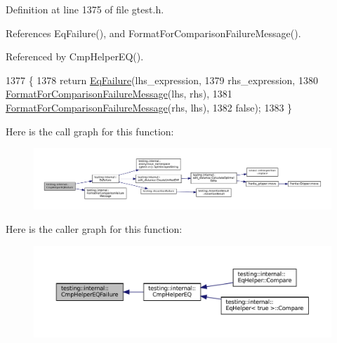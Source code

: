 Definition at line 1375 of file gtest.\+h.



References Eq\+Failure(), and Format\+For\+Comparison\+Failure\+Message().



Referenced by Cmp\+Helper\+E\+Q().


\begin{DoxyCode}
1377                                                                  \{
1378   \textcolor{keywordflow}{return} \hyperlink{namespacetesting_1_1internal_a08725846ff184d3e79bcf5be4df19157}{EqFailure}(lhs\_expression,
1379                    rhs\_expression,
1380                    \hyperlink{namespacetesting_1_1internal_a91ab078f10adc669f09b7f604975c518}{FormatForComparisonFailureMessage}(lhs, rhs),
1381                    \hyperlink{namespacetesting_1_1internal_a91ab078f10adc669f09b7f604975c518}{FormatForComparisonFailureMessage}(rhs, lhs),
1382                    \textcolor{keyword}{false});
1383 \}
\end{DoxyCode}
Here is the call graph for this function\+:
\nopagebreak
\begin{figure}[H]
\begin{center}
\leavevmode
\includegraphics[width=350pt]{namespacetesting_1_1internal_a1def8ec9393360a1b34a20528703e7f7_cgraph}
\end{center}
\end{figure}
Here is the caller graph for this function\+:
\nopagebreak
\begin{figure}[H]
\begin{center}
\leavevmode
\includegraphics[width=350pt]{namespacetesting_1_1internal_a1def8ec9393360a1b34a20528703e7f7_icgraph}
\end{center}
\end{figure}
\mbox{\label{namespacetesting_1_1internal_a98ce463e5dbe0c6120fa817e1f8f2944}} 
